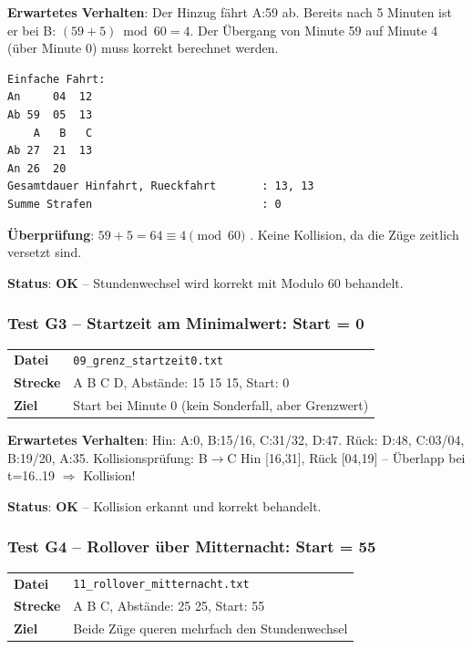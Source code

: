\documentclass[12pt,a4paper]{article}
\newcommand{\pass}{\textcolor{passgreen}{\textbf{OK}}}
\begin{document}
\textbf{Erwartetes Verhalten}: Der Hinzug fährt A:59 ab. Bereits nach 5 Minuten ist er bei B: $(59 + 5) \bmod 60 = 4$. Der Übergang von Minute 59 auf Minute 4 (über Minute 0) muss korrekt berechnet werden.

\begin{lstlisting}[caption={Ausgabe G2 -- Wrap-around bei Minute 0}]
Einfache Fahrt:
An     04  12
Ab 59  05  13
    A   B   C
Ab 27  21  13
An 26  20
Gesamtdauer Hinfahrt, Rueckfahrt       : 13, 13
Summe Strafen                          : 0
\end{lstlisting}

\textbf{Überprüfung}: $59 + 5 = 64 \equiv 4 \pmod{60}$ \checkmark. Keine Kollision, da die Züge zeitlich versetzt sind.

\textbf{Status}: \pass{} -- Stundenwechsel wird korrekt mit Modulo 60 behandelt.

\subsubsection{Test G3 -- Startzeit am Minimalwert: Start = 0}

\begin{center}
\begin{tabular}{ll}
\toprule
\textbf{Datei} & \texttt{09\_grenz\_startzeit0.txt} \\
\textbf{Strecke} & A B C D, Abstände: 15 15 15, Start: 0 \\
\textbf{Ziel} & Start bei Minute 0 (kein Sonderfall, aber Grenzwert) \\
\bottomrule
\end{tabular}
\end{center}

\textbf{Erwartetes Verhalten}: Hin: A:0, B:15/16, C:31/32, D:47. Rück: D:48, C:03/04, B:19/20, A:35. Kollisionsprüfung: B$\to$C Hin [16,31], Rück [04,19] -- Überlapp bei t=16..19 $\Rightarrow$ Kollision!

\textbf{Status}: \pass{} -- Kollision erkannt und korrekt behandelt.

\subsubsection{Test G4 -- Rollover über Mitternacht: Start = 55}

\begin{center}
\begin{tabular}{ll}
\toprule
\textbf{Datei} & \texttt{11\_rollover\_mitternacht.txt} \\
\textbf{Strecke} & A B C, Abstände: 25 25, Start: 55 \\
\textbf{Ziel} & Beide Züge queren mehrfach den Stundenwechsel \\
\bottomrule
\end{tabular}
\end{center}
\end{document}
